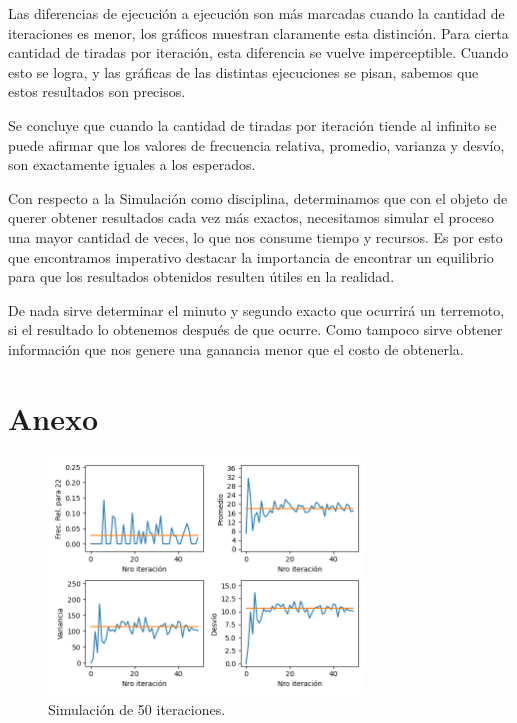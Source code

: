 \documentclass{article}
\begin{document}
Las diferencias de ejecución a ejecución son más marcadas cuando la cantidad de iteraciones es menor, los gráficos muestran claramente esta distinción. Para cierta cantidad de tiradas por iteración, esta diferencia se vuelve imperceptible. Cuando esto se logra, y las gráficas de las distintas ejecuciones se pisan, sabemos que estos resultados son precisos. 

Se concluye que cuando la cantidad de tiradas por iteración tiende al infinito se puede afirmar que los valores de frecuencia relativa, promedio, varianza y desvío, son exactamente iguales a los esperados.

Con respecto a la Simulación como disciplina, determinamos que con el objeto de querer obtener resultados cada vez más exactos, necesitamos simular el proceso una mayor cantidad de veces, lo que nos consume tiempo y recursos. Es por esto que encontramos imperativo destacar la importancia de encontrar un equilibrio para que los resultados obtenidos resulten útiles en la realidad.

De nada sirve determinar el minuto y segundo exacto que ocurrirá un terremoto, si el resultado lo obtenemos después de que ocurre. Como tampoco sirve obtener información que nos genere una ganancia menor que el costo de obtenerla. 








\newpage

\section{Anexo}

\renewcommand{\figurename}{Fig.}

\begin{figure}[H]
\centering
\includegraphics[width=0.75\textwidth]{images/Figure_1.png}
\caption{Simulación de 50 iteraciones.}
\label{fig:50iter}
\end{figure}
\end{document}
